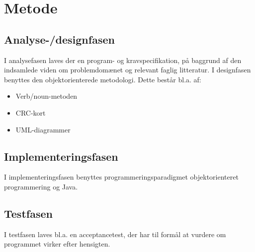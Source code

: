 \documentclass[a4paper,12pt]{report}
\begin{document}
\section{Metode}
\subsection{Analyse-/designfasen}
I analysefasen laves der en program- og kravspecifikation, på baggrund af den indsamlede viden om problemdomænet og relevant faglig litteratur. 
I designfasen benyttes den objektorienterede metodologi. Dette består bl.a. af:
\begin{itemize}
	\item Verb/noun-metoden
	\item CRC-kort
	\item UML-diagrammer
\end{itemize}

\subsection{Implementeringsfasen}
I implementeringsfasen benyttes programmeringsparadigmet objektorienteret programmering og Java. 

\subsection{Testfasen}
I testfasen laves bl.a. en acceptancetest, der har til formål at vurdere om programmet virker efter hensigten.
\end{document}
